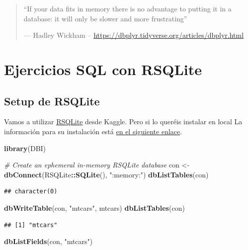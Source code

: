 \documentclass[
]{book}
\newenvironment{Shaded}{\begin{snugshade}}{\end{snugshade}}
\newcommand{\CommentTok}[1]{\textcolor[rgb]{0.56,0.35,0.01}{\textit{#1}}}
\newcommand{\FunctionTok}[1]{\textcolor[rgb]{0.13,0.29,0.53}{\textbf{#1}}}
\newcommand{\NormalTok}[1]{#1}
\newcommand{\OtherTok}[1]{\textcolor[rgb]{0.56,0.35,0.01}{#1}}
\newcommand{\SpecialCharTok}[1]{\textcolor[rgb]{0.81,0.36,0.00}{\textbf{#1}}}
\newcommand{\StringTok}[1]{\textcolor[rgb]{0.31,0.60,0.02}{#1}}
\begin{document}
\begin{quote}
``If your data fits in memory
there is no advantage to putting it in a database:
it will only be slower and more frustrating''

--- Hadley Wickham -- \url{https://dbplyr.tidyverse.org/articles/dbplyr.html}
\end{quote}

\section{Ejercicios SQL con RSQLite}\label{ejercicios-sql-con-rsqlite}

\subsection{Setup de RSQLite}\label{setup-de-rsqlite}

Vamos a utilizar \href{https://cran.r-project.org/web/packages/RSQLite/index.html}{RSQLite} desde Kaggle. Pero si lo queréis instalar en local La información para su instalación está \href{https://db.rstudio.com/databases/sqlite/}{en el siguiente enlace}.

\begin{Shaded}
\begin{Highlighting}[]
\FunctionTok{library}\NormalTok{(DBI)}

\CommentTok{\# Create an ephemeral in{-}memory RSQLite database}
\NormalTok{con }\OtherTok{\textless{}{-}} \FunctionTok{dbConnect}\NormalTok{(RSQLite}\SpecialCharTok{::}\FunctionTok{SQLite}\NormalTok{(), }\StringTok{":memory:"}\NormalTok{)}
\FunctionTok{dbListTables}\NormalTok{(con)}
\end{Highlighting}
\end{Shaded}

\begin{verbatim}
## character(0)
\end{verbatim}

\begin{Shaded}
\begin{Highlighting}[]
\FunctionTok{dbWriteTable}\NormalTok{(con, }\StringTok{"mtcars"}\NormalTok{, mtcars)}
\FunctionTok{dbListTables}\NormalTok{(con)}
\end{Highlighting}
\end{Shaded}

\begin{verbatim}
## [1] "mtcars"
\end{verbatim}

\begin{Shaded}
\begin{Highlighting}[]
\FunctionTok{dbListFields}\NormalTok{(con, }\StringTok{"mtcars"}\NormalTok{)}
\end{Highlighting}
\end{Shaded}
\end{document}

